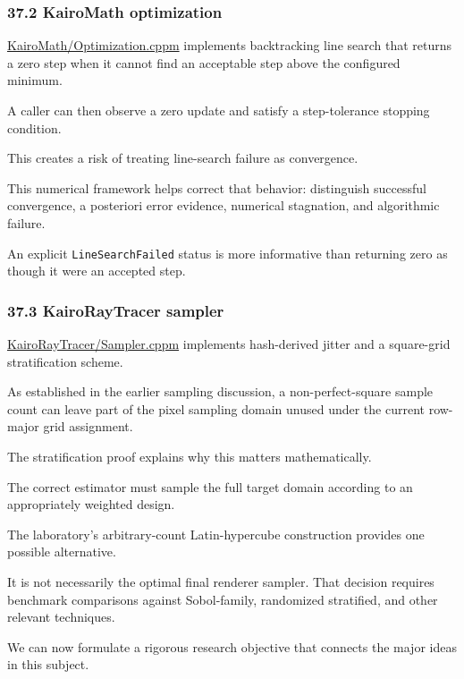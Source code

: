 \subsubsection{37.2 KairoMath optimization}\label{02-foundations-ii-ch039-kairomath-optimization}

\href{https://github.com/swayam8624/KairoMath/blob/master/Optimization.cppm?utm_source=chatgpt.com}{KairoMath/Optimization.cppm} implements backtracking line search that returns a zero step when it cannot find an acceptable step above the configured minimum.

A caller can then observe a zero update and satisfy a step-tolerance stopping condition.

This creates a risk of treating line-search failure as convergence.

This numerical framework helps correct that behavior: distinguish successful convergence, a posteriori error evidence, numerical stagnation, and algorithmic failure.

An explicit \texttt{LineSearchFailed} status is more informative than returning zero as though it were an accepted step.

\subsubsection{37.3 KairoRayTracer sampler}\label{02-foundations-ii-ch039-kairoraytracer-sampler}

\href{https://github.com/swayam8624/KairoRayTracer/blob/main/Sampler.cppm?utm_source=chatgpt.com}{KairoRayTracer/Sampler.cppm} implements hash-derived jitter and a square-grid stratification scheme.

As established in the earlier sampling discussion, a non-perfect-square sample count can leave part of the pixel sampling domain unused under the current row-major grid assignment.

The stratification proof explains why this matters mathematically.

The correct estimator must sample the full target domain according to an appropriately weighted design.

The laboratory's arbitrary-count Latin-hypercube construction provides one possible alternative.

It is not necessarily the optimal final renderer sampler. That decision requires benchmark comparisons against Sobol-family, randomized stratified, and other relevant techniques.

We can now formulate a rigorous research objective that connects the major ideas in this subject.

